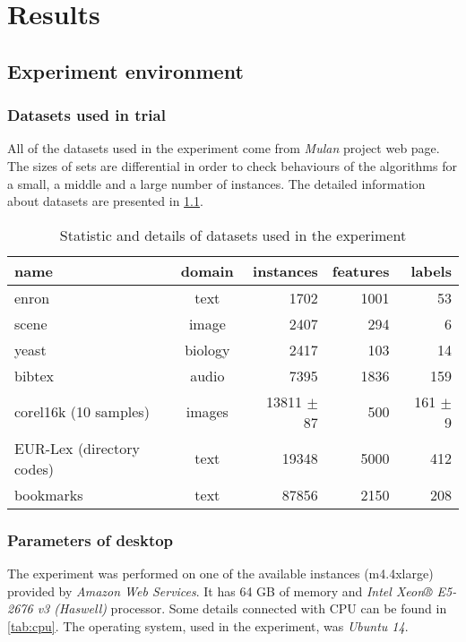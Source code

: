 
\chapter{Results}

\section{Experiment environment}
\subsection{Datasets used in trial}

All of the datasets used in the experiment come from \textit{Mulan} project web page. The sizes of sets are differential in order to check behaviours of the algorithms for a small, a middle and a large number of instances. The detailed information about datasets are presented in \cref{tab:exp1}. 

\begin{table}[h]
\centering
\caption{Statistic and details of datasets used in the experiment}
\label{tab:exp1}
    \begin{tabular}{l|c|r|r|r}
    name & domain & instances & features & labels \\ \hline \hline
    enron & text  &  1702  & 1001 &  53 \\
    scene & image &  2407  & 294 & 6 \\   
    yeast & biology & 2417 & 103 & 14 \\
    bibtex & audio & 7395 & 1836 & 159 \\
    corel16k (10 samples) & images & 13811 $\pm$ 87 & 500 & 161 $\pm$ 9\\
    EUR-Lex (directory codes) & text & 19348 & 5000 & 412 \\
    bookmarks & text & 87856 & 2150 & 208
    \end{tabular}
\end{table}

\subsection{Parameters of desktop}

The experiment was performed on one of the available instances (m4.4xlarge) provided by \textit{Amazon Web Services}. It has 64 GB of memory and \textit{Intel Xeon® E5-2676 v3 (Haswell)} processor. Some details connected with CPU can be found in \cref{tab:cpu}. The operating system, used in the experiment, was \textit{Ubuntu 14}.

